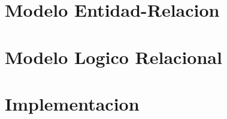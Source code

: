\documentclass[11pt, a4paper, spanish]{article}
\newenvironment{borde}[1]
{\begin{lrbox}{\fmbox}\begin{minipage}{#1}}
{\end{minipage}\end{lrbox}\fbox{\usebox{\fmbox}}\\[10pt]}
\begin{document}


\newpage
	
\section{Modelo Entidad-Relacion}

\section{Modelo Logico Relacional}

\section{Implementacion}
\end{document}
